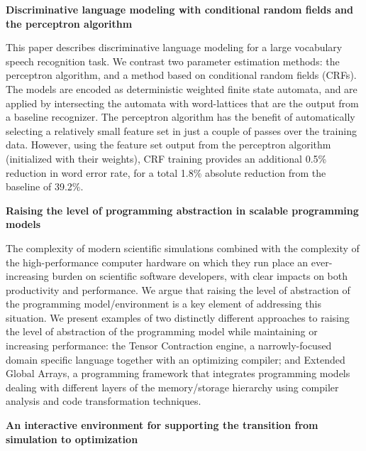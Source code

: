 \documentclass[11pt]{article}
\begin{document}
\bigskip
\noindent
\textbf{Discriminative language modeling with conditional random fields and the perceptron algorithm}
\cite{roark2004acl}

\noindent
This paper describes discriminative language modeling
for a large vocabulary speech recognition task. We contrast 
two parameter estimation methods: the perceptron
algorithm, and a method based on conditional random
fields (CRFs). The models are encoded as deterministic weighted 
finite state automata, and are applied by
intersecting the automata with word-lattices that are the
output from a baseline recognizer. The perceptron algorithm 
has the benefit of automatically selecting a relatively 
small feature set in just a couple of passes over the
training data. However, using the feature set output from
the perceptron algorithm (initialized with their weights),
CRF training provides an additional 0.5\% reduction in
word error rate, for a total 1.8\% absolute reduction from
the baseline of 39.2\%.

\bigskip
\noindent
\textbf{Raising the level of programming abstraction in scalable 
programming models}
\cite{bernholdt2004raising}

\noindent
The  complexity  of modern scientific  simulations
combined with  the  complexity  of the  high-performance
computer  hardware  on  which  they  run  place  an  
ever-increasing burden on scientific software developers, with
clear impacts on both productivity and performance.  We
argue  that  raising  the  level  of  abstraction  of  the
programming model/environment is a  key  element of
addressing this situation.  We present examples of two 
distinctly  different  approaches  to  raising  the  level  of 
abstraction of the programming model while maintaining
or  increasing performance: the  Tensor Contraction
engine,  a narrowly-focused  domain specific  language
together  with  an optimizing compiler;  and Extended 
Global Arrays, a programming framework that integrates
programming models dealing with different layers of the 
memory/storage hierarchy  using  compiler  analysis and
code transformation techniques. 


\bigskip
\noindent
\textbf{An interactive environment for supporting the transition from simulation to optimization}
\cite{bischof2003interactive}
\end{document}
